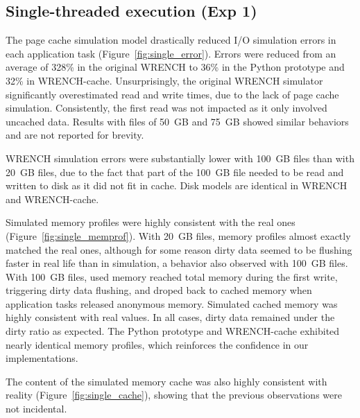\documentclass[conference]{IEEEtran}
\newcommand{\wrench}{WRENCH\xspace}
\begin{document}
        \subsection{Single-threaded execution (Exp 1)}


        The page cache simulation model drastically reduced I/O simulation
        errors in each application task (Figure~\ref{fig:single_error}). Errors were reduced from an average
        of 328\% in the original \wrench to 36\% in the Python prototype and
        32\% in \wrench-cache. Unsurprisingly, the original \wrench simulator
        significantly overestimated read and write times, due to the lack
        of page cache simulation. Consistently, the first read was not impacted
        as it only involved uncached data. Results with files of 50~GB and 75~GB
        showed similar behaviors and are not reported for brevity.

        \wrench simulation errors were substantially lower with 100~GB
        files than with 20~GB files, due to the fact that part of the
        100~GB file needed to be read and written to disk as it did not fit in cache. Disk models are
        identical in WRENCH and WRENCH-cache.

        Simulated memory profiles were highly consistent with the real ones
        (Figure~\ref{fig:single_memprof}). With 20~GB files, memory profiles almost exactly matched the
        real ones, although for some reason dirty data seemed to be flushing faster in real
        life than in simulation, a behavior also
        observed with 100~GB files. With 100~GB files, used memory reached
        total memory during the first write, triggering dirty data
        flushing, and droped back to cached memory when application tasks
        released anonymous memory. Simulated cached memory was highly
        consistent with real values. In all cases, dirty data remained under the dirty ratio as
        expected. The Python prototype and \wrench-cache exhibited nearly
        identical memory profiles, which reinforces the confidence in our
        implementations.

        The content of the simulated memory cache was also highly consistent
        with reality (Figure~\ref{fig:single_cache}), showing that the
        previous observations were not incidental.
\end{document}

